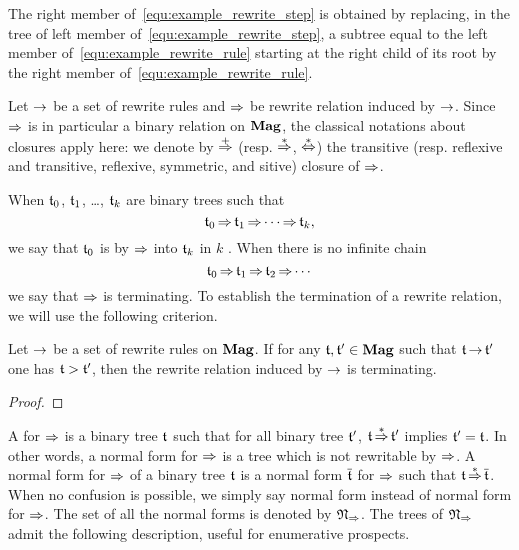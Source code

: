 The right member of~\eqref{equ:example_rewrite_step} is obtained by
replacing, in the tree of left member
of~\eqref{equ:example_rewrite_step}, a subtree equal to the left
member of~\eqref{equ:example_rewrite_rule} starting at the right child
of its root by the right member of~\eqref{equ:example_rewrite_rule}.
\medbreak

Let $\operatorname{\to}$ be a set of rewrite rules and $\operatorname{\Rightarrow}$ be rewrite
relation induced by $\operatorname{\to}$. Since $\operatorname{\Rightarrow}$ is in particular a
binary relation on $\mathbf{Mag}$, the classical notations about closures apply
here: we denote by $\operatorname{\overset{+}{\operatorname{\Rightarrow}}}$ (resp. $\operatorname{\overset{\ast}{\operatorname{\Rightarrow}}}$,
$\operatorname{\overset{\ast}{\Leftrightarrow}}$) the transitive (resp. reflexive and transitive,
reflexive, symmetric, and sitive) closure of $\operatorname{\Rightarrow}$.
\medbreak

When $\mathfrak{t}_0$, $\mathfrak{t}_1$, \dots, $\mathfrak{t}_k$ are binary trees such that
\begin{equation}
    \mathfrak{t}_0 \operatorname{\Rightarrow} \mathfrak{t}_1 \operatorname{\Rightarrow} \cdots \operatorname{\Rightarrow} \mathfrak{t}_k,
\end{equation}
we say that $\mathfrak{t}_0$ is  by $\operatorname{\Rightarrow}$ into $\mathfrak{t}_k$
in $k$ . When there is no infinite chain
\begin{equation} \label{equ:infinite_chain}
    \mathfrak{t}_0 \operatorname{\Rightarrow} \mathfrak{t}_1 \operatorname{\Rightarrow} \mathfrak{t}_2 \operatorname{\Rightarrow} \cdots
\end{equation}
we say that $\operatorname{\Rightarrow}$ is terminating. To establish the termination
of a rewrite relation, we will use the following criterion.
\medbreak

\begin{Lemma}\label{lem:prefix_word_termination}
    Let $\operatorname{\to}$ be a set of rewrite rules on $\mathbf{Mag}$. If for any
    $\mathfrak{t}, \mathfrak{t}' \in \mathbf{Mag}$ such that $\mathfrak{t} \operatorname{\to} \mathfrak{t}'$ one has
    $\mathfrak{t} > \mathfrak{t}'$, then the rewrite relation induced by $\operatorname{\to}$ is
    terminating.
\end{Lemma}
\begin{proof}
\end{proof}
\medbreak

A  for $\operatorname{\Rightarrow}$ is a binary tree $\mathfrak{t}$ such
that for all binary tree $\mathfrak{t}'$, $\mathfrak{t} \operatorname{\overset{\ast}{\operatorname{\Rightarrow}}} \mathfrak{t}'$ implies
$\mathfrak{t}' = \mathfrak{t}$. In other words, a normal form for $\operatorname{\Rightarrow}$ is a
tree which is not rewritable by $\operatorname{\Rightarrow}$. A normal form for
$\operatorname{\Rightarrow}$ of a binary tree $\mathfrak{t}$ is a normal form $\overline{\mathfrak{t}}$
for $\operatorname{\Rightarrow}$ such that $\mathfrak{t}\operatorname{\overset{\ast}{\operatorname{\Rightarrow}}}\overline{\mathfrak{t}}$. When no
confusion is possible, we simply say normal form instead of normal form
for $\operatorname{\Rightarrow}$. The set of all the normal forms is denoted by
$\mathfrak{N}_{\operatorname{\Rightarrow}}$. The trees of $\mathfrak{N}_{\operatorname{\Rightarrow}}$
admit the following description, useful for enumerative prospects.
\medbreak

